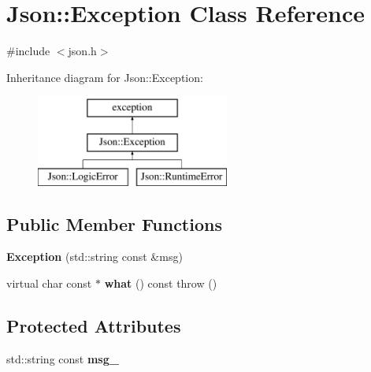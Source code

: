 \hypertarget{class_json_1_1_exception}{}\section{Json\+:\+:Exception Class Reference}
\label{class_json_1_1_exception}


{\ttfamily \#include $<$json.\+h$>$}

Inheritance diagram for Json\+:\+:Exception\+:\begin{figure}[H]
\begin{center}
\leavevmode
\includegraphics[height=3.000000cm]{class_json_1_1_exception}
\end{center}
\end{figure}
\subsection*{Public Member Functions}
\begin{DoxyCompactItemize}
\item 
\hypertarget{class_json_1_1_exception_a4dd1b9f007bed842e3ef9883d965fe22}{}{\bfseries Exception} (std\+::string const \&msg)\label{class_json_1_1_exception_a4dd1b9f007bed842e3ef9883d965fe22}

\item 
\hypertarget{class_json_1_1_exception_a93032b715e86fc37ad318c60eac4cad7}{}virtual char const $\ast$ {\bfseries what} () const   throw ()\label{class_json_1_1_exception_a93032b715e86fc37ad318c60eac4cad7}

\end{DoxyCompactItemize}
\subsection*{Protected Attributes}
\begin{DoxyCompactItemize}
\item 
\hypertarget{class_json_1_1_exception_a6457bfa979e1bba636ba34605203f6a0}{}std\+::string const {\bfseries msg\+\_\+}\label{class_json_1_1_exception_a6457bfa979e1bba636ba34605203f6a0}

\end{DoxyCompactItemize}


